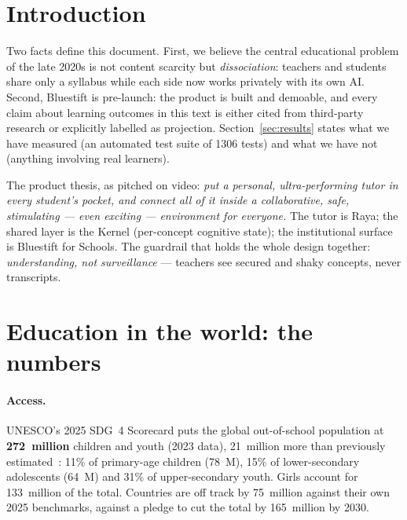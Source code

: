 \documentclass[11pt,a4paper]{article}
\let\oldsection\section
\renewcommand{\section}{\clearpage\oldsection}
\newcommand{\vitestcount}{1306}
\begin{document}
\tableofcontents
\newpage

\section{Introduction}

Two facts define this document. First, we believe the central
educational problem of the late 2020s is not content scarcity but
\emph{dissociation}: teachers and students share only a syllabus while each
side now works privately with its own AI. Second, Bluestift is pre-launch:
the product is built and demoable, and every claim about learning outcomes in
this text is either cited from third-party research or explicitly labelled as
projection. Section~\ref{sec:results} states what we have measured (an
automated test suite of \vitestcount{} tests) and what we have not (anything
involving real learners).

The product thesis, as pitched on video: \emph{put a personal, ultra-performing
tutor in every student's pocket, and connect all of it inside a collaborative,
safe, stimulating --- even exciting --- environment for everyone.} The tutor is
Raya; the shared layer is the Kernel (per-concept cognitive state); the
institutional surface is Bluestift for Schools. The guardrail that holds the
whole design together: \emph{understanding, not surveillance} --- teachers see
secured and shaky concepts, never transcripts.

\section{Education in the world: the numbers}
\label{sec:numbers}

\paragraph{Access.} UNESCO's 2025 SDG~4 Scorecard puts the global out-of-school
population at \textbf{272~million} children and youth (2023 data), 21~million
more than previously estimated~\cite{uis-scorecard-2025}: 11\% of primary-age
children (78~M), 15\% of lower-secondary adolescents (64~M) and 31\% of
upper-secondary youth. Girls account for 133~million of the total. Countries
are off track by 75~million against their own 2025 benchmarks, against a pledge
to cut the total by 165~million by 2030.
\end{document}

